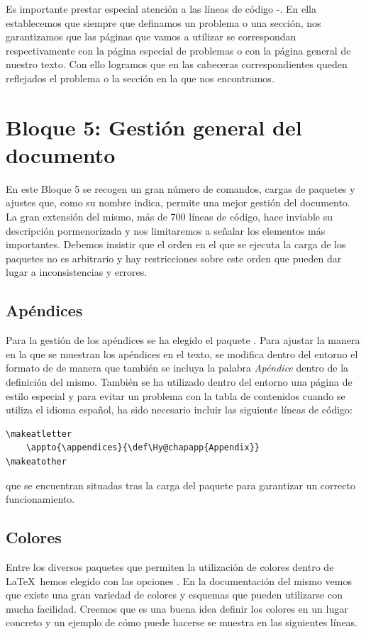 Es importante prestar especial atención a las líneas de código -. En ella establecemos que siempre que definamos un problema o una sección, nos garantizamos que las páginas que vamos a utilizar se correspondan respectivamente con la página especial de problemas o con la página general de nuestro texto. Con ello logramos que en las cabeceras correspondientes queden reflejados el problema o la sección en la que nos encontramos. 

\section{Bloque 5: Gestión general del documento}
En este Bloque 5 se recogen un gran número de comandos, cargas de paquetes y ajustes que, como su nombre indica, permite una mejor gestión del documento.  La gran extensión del mismo, más de 700 líneas de código, hace inviable su descripción pormenorizada y nos limitaremos a señalar los elementos más importantes. Debemos insistir que el orden en el que se ejecuta la carga de los paquetes no es arbitrario y hay restricciones sobre este orden que pueden dar lugar a inconsistencias y errores. 

\subsection{Apéndices}
Para la gestión de los apéndices se ha elegido el paquete . Para ajustar la manera en la que se muestran los apéndices en el texto, se modifica dentro del entorno el formato de  de manera que también se incluya la palabra \emph{Apéndice} dentro de la definición del mismo. También se ha utilizado dentro del entorno una página de estilo especial y para evitar un problema con la tabla de contenidos cuando se utiliza el idioma español, ha sido necesario incluir las siguiente líneas de código:

\begin{lstlisting}[frame=none]
\makeatletter
	\appto{\appendices}{\def\Hy@chapapp{Appendix}}
\makeatother
\end{lstlisting}
%
que se encuentran situadas tras la carga del paquete  para garantizar un correcto funcionamiento.

\subsection{Colores}
Entre los diversos paquetes que permiten la utilización de colores dentro de \LaTeX\ hemos elegido  con las opciones . En la documentación del mismo vemos que existe una gran variedad de colores y esquemas que pueden utilizarse con mucha facilidad. Creemos que es una buena idea definir los colores en un lugar concreto y un ejemplo de cómo puede hacerse se muestra en las siguientes líneas.

